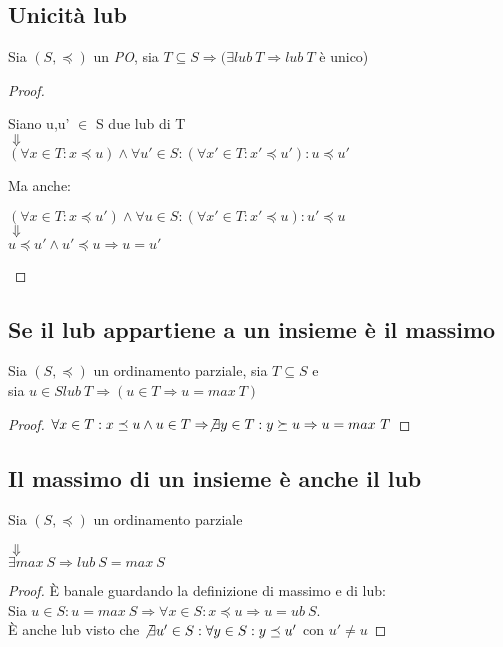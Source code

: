 \subsection{Unicità lub}
\begin{esercizio}
  Sia $(S, \preceq)$ un \emph{PO}, sia $T \subseteq S \Rightarrow (\exists lub\ T \Rightarrow lub\ T$ è unico)
\end{esercizio}
\begin{proof}
  \begin{center}
    Siano u,u' $\in$ S due lub di T\\
    $\Downarrow$\\
    $(\forall x \in T : x \preceq u) \land \forall u' \in S :
    (\forall x' \in T : x' \preceq u') : u \preceq u'$
  \end{center}
  Ma anche:
  \begin{center}
    $(\forall x \in T : x \preceq u') \land \forall u \in S :
    (\forall x' \in T : x' \preceq u) : u' \preceq u$\\
    $\Downarrow$\\
    $u \preceq u' \land u' \preceq u \Rightarrow u = u'$
  \end{center}
\end{proof}

\subsection{Se il lub appartiene a un insieme è il massimo}
\begin{esercizio}[$lub\ T \in T \Rightarrow lub\ T = max\ T$]
  Sia $(S, \preceq)$ un ordinamento parziale, sia $T \subseteq S$ e\\
  sia $u \in S lub\ T \Rightarrow (u \in T \Rightarrow u = max\ T)$
  \begin{proof}
    $\forall x \in T : x \preceq u \land u \in T \Rightarrow \not \exists y \in T : y \succeq u \Rightarrow u = max\ T$
  \end{proof}
\end{esercizio}

\subsection{Il massimo di un insieme è anche il lub}
\begin{esercizio}[$\exists max\ S \Rightarrow lub\ S = max\ S$]
  Sia $(S, \preceq)$ un ordinamento parziale
  \begin{center}
    $\Downarrow$\\
    $\exists max\ S \Rightarrow lub\ S = max\ S$
  \end{center}
  \begin{proof}
    È banale guardando la definizione di massimo e di lub:\\
    Sia $u \in S : u = max\ S \Rightarrow \forall x \in S : x \preceq u \Rightarrow u = ub\ S$.\\
    È anche lub visto che $\not \exists u' \in S : \forall y \in S : y \preceq u'$ con $ u' \neq u$
  \end{proof}
\end{esercizio}

